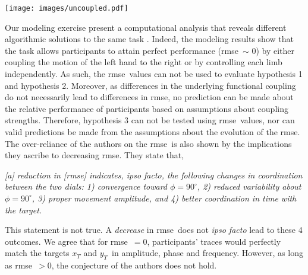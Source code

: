 \documentclass[11pt]{article}
\newcommand{\rmse}{\gls{rmse}}
\newcommand{\myquote}[1]{\textit{#1}}
\newcommand{\xt}{x_{T}}
\newcommand{\yt}{y_{T}}
\newcommand{\xti}{x_{T,i}}
\newcommand{\yti}{y_{T,i}}
\newcommand{\xto}{x_{T,p}}
\newcommand{\yto}{y_{T,p}}
\newcommand{\target}{$\xt$ and $\yt$}
\newcommand{\nnin}{$\xti$ and $\yti$}
\newcommand{\nnout}{$\xto$ and $\yto$}
\begin{document}
\begin{figure*}[t]
	\centering
	\texttt{[image: images/uncoupled.pdf]}
	\caption{Results of training a feedforward neural network to predict the next 15 samples the target signals \target\ (\nnout) based on the 15 past samples (\nnin). In these results, the networks connection matrix was constrained. (a) A single example of inputs \nnin (full lines) and the predicted subsequent samples, \nnout (dashed lines). The thick gray lines show the target values for \nnout. (b) Similar as for panel (a) but $\xti$ was replaced with a noise signal. (c) Similar as for panel (a) but $\yti$ was replaced with a noise signal. (d) The weight matrix of the trained neural network.}
	\label{fig:uncoupled}
\end{figure*}

Our modeling exercise present a computational analysis that reveals different algorithmic solutions to the same task \citep{Marr2010}. Indeed, the modeling results show that the task allows participants to attain perfect performance (\rmse\ $\sim$ 0) by either coupling the motion of the left hand to the right or by controlling each limb independently. As such, the \rmse\ values can not be used to evaluate hypothesis 1 and hypothesis 2. Moreover, as differences in the underlying functional coupling do not necessarily lead to differences in \rmse, no prediction can be made about the relative performance of participants based on assumptions about coupling strengths. Therefore, hypothesis 3 can not be tested using \rmse\ values, nor can valid predictions be made from the assumptions about the evolution of the \rmse. The over-reliance of the authors on the \rmse\ is also shown by the implications they ascribe to decreasing \rmse. They state that,

\vspace{11pt}
\noindent \myquote {[a] reduction in [\rmse] indicates, ipso facto, the following changes in coordination between the two dials: 1) convergence toward  $\phi = 90^\circ$, 2) reduced variability about $\phi = 90^\circ$, 3) proper movement amplitude, and 4) better coordination in time with the target.}
\vspace{11pt}

This statement is not true. A \textit{decrease} in \rmse\ does not \textit{ipso facto} lead to these 4 outcomes. We agree that for \rmse\ $=0$, participants' traces would perfectly match the targets \target\ in amplitude, phase and frequency. However, as long as \rmse\ $>0$, the conjecture of the authors does not hold. 
\end{document}
